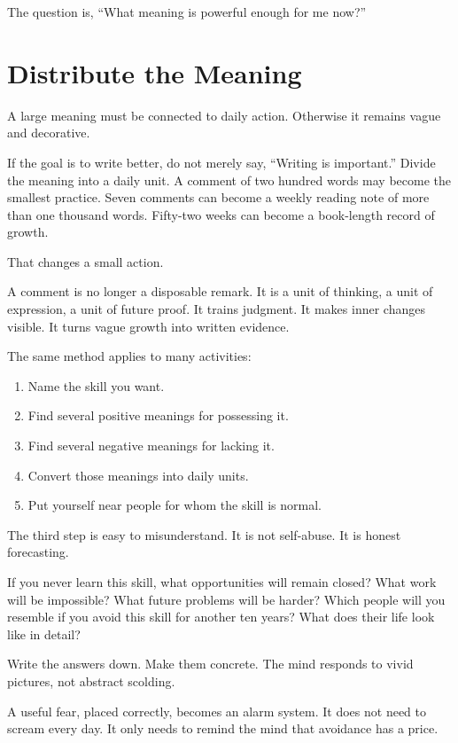 The question is, ``What meaning is powerful enough for me now?''

\section*{Distribute the Meaning}

A large meaning must be connected to daily action. Otherwise it remains vague and decorative.

If the goal is to write better, do not merely say, ``Writing is important.'' Divide the meaning into a daily unit. A comment of two hundred words may become the smallest practice. Seven comments can become a weekly reading note of more than one thousand words. Fifty-two weeks can become a book-length record of growth.

That changes a small action.

A comment is no longer a disposable remark. It is a unit of thinking, a unit of expression, a unit of future proof. It trains judgment. It makes inner changes visible. It turns vague growth into written evidence.

The same method applies to many activities:

\begin{enumerate}
\item Name the skill you want.
\item Find several positive meanings for possessing it.
\item Find several negative meanings for lacking it.
\item Convert those meanings into daily units.
\item Put yourself near people for whom the skill is normal.
\end{enumerate}

The third step is easy to misunderstand. It is not self-abuse. It is honest forecasting.

If you never learn this skill, what opportunities will remain closed? What work will be impossible? What future problems will be harder? Which people will you resemble if you avoid this skill for another ten years? What does their life look like in detail?

Write the answers down. Make them concrete. The mind responds to vivid pictures, not abstract scolding.

A useful fear, placed correctly, becomes an alarm system. It does not need to scream every day. It only needs to remind the mind that avoidance has a price.

